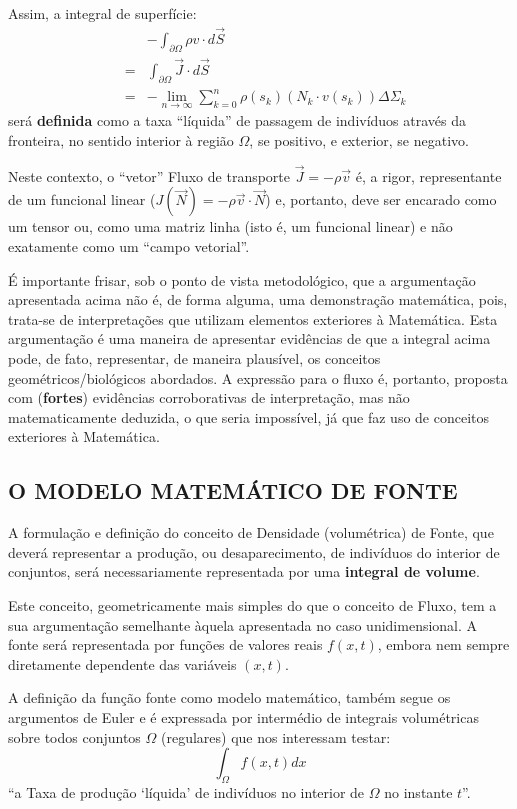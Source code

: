 Assim, a integral de superfície:
\[\begin{array}{rcl}
& &-\displaystyle\int_{\partial \Omega} \rho v \cdot d\vec{S} \\[0.5cm]
&=& \displaystyle\int_{\partial \Omega} \vec{J} \cdot d\vec{S} \\[0.5cm]
&=& -\displaystyle\lim_{n \to \infty} \sum_{k=0}^{n} \rho(s_k) (N_k \cdot v(s_k)) \Delta\Sigma_k
\end{array}\]
será \textbf{definida} como a taxa ``líquida'' de passagem de indivíduos através da fronteira, no sentido interior à região \(\Omega\), se positivo, e exterior, se negativo.

Neste contexto, o ``vetor'' Fluxo de transporte \(\vec{J} = -\rho \vec{v}\) é, a rigor, representante de um funcional linear (\(J(\vec{N}) = -\rho \vec{v} \cdot \vec{N}\)) e, portanto, deve ser encarado como um tensor ou, como uma matriz linha (isto é, um funcional linear) e não exatamente como um ``campo vetorial''.

É importante frisar, sob o ponto de vista metodológico, que a argumentação apresentada acima não é, de forma alguma, uma demonstração matemática, pois, trata-se de interpretações que utilizam elementos exteriores à Matemática. Esta argumentação é uma maneira de apresentar evidências de que a integral acima pode, de fato, representar, de maneira plausível, os conceitos geométricos/biológicos abordados. A expressão para o fluxo é, portanto, proposta com (\textbf{fortes}) evidências corroborativas de interpretação, mas não matematicamente deduzida, o que seria impossível, já que faz uso de conceitos exteriores à Matemática.

\subsection{O MODELO MATEMÁTICO DE FONTE}

A formulação e definição do conceito de Densidade (volumétrica) de Fonte, que deverá representar a produção, ou desaparecimento, de indivíduos do interior de conjuntos, será necessariamente representada por uma \textbf{integral de volume}.

Este conceito, geometricamente mais simples do que o conceito de Fluxo, tem a sua argumentação semelhante àquela apresentada no caso unidimensional. A fonte será representada por funções de valores reais \(f(x,t)\), embora nem sempre diretamente dependente das variáveis \((x,t)\).

A definição da função fonte como modelo matemático, também segue os argumentos de Euler e é expressada por intermédio de integrais volumétricas sobre todos conjuntos \(\Omega\) (regulares) que nos interessam testar:
\[\displaystyle\int_{\Omega} f(x,t) dx\]
``a Taxa de produção `líquida' de indivíduos no interior de \(\Omega\) no instante \(t\)''.

